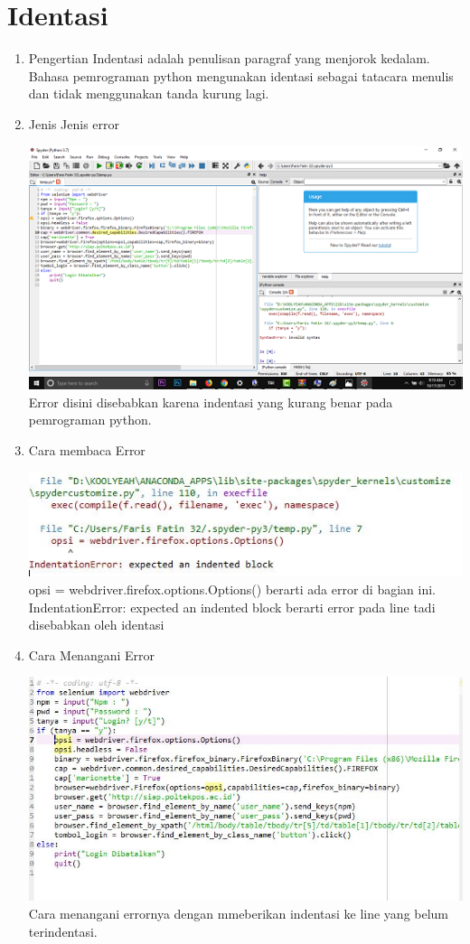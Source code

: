 \section {Identasi}
\begin{enumerate}
\item Pengertian
Indentasi adalah penulisan paragraf yang menjorok kedalam. Bahasa pemrograman python mengunakan identasi sebagai tatacara menulis dan tidak menggunakan tanda kurung lagi.

\item {Jenis Jenis error}

\includegraphics{gambar/identasi1}
Error disini disebabkan karena indentasi yang kurang benar pada pemrograman python. 


\item {Cara membaca Error}

\includegraphics{gambar/identasi3.jpg}
opsi = webdriver.firefox.options.Options() berarti ada error di bagian ini.\\
IndentationError: expected an indented block berarti error pada line tadi disebabkan oleh identasi\\


\item{Cara Menangani Error}

\includegraphics{gambar/identasi4.jpg}
Cara menangani errornya dengan mmeberikan indentasi ke line yang belum terindentasi.\\
\end{enumerate}







